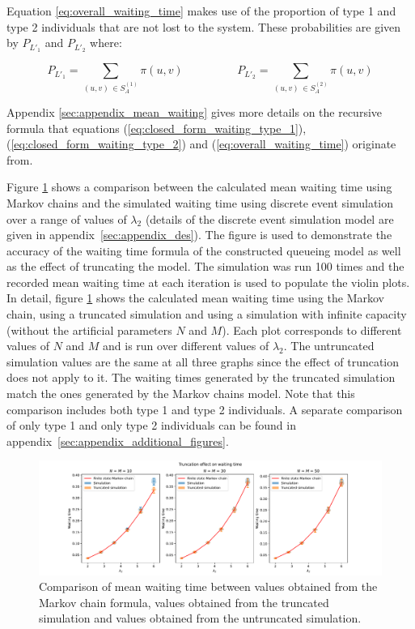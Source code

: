 Equation \ref{eq:overall_waiting_time} makes use of the proportion of type 1 
and type 2 individuals that are not lost to the system. These probabilities are 
given by \(P_{L'_1}\) and \(P_{L'_2}\) where:

\begin{equation}\label{eq:proportion_of_accepting_individuals}
    P_{L'_1} = \sum_{(u,v) \, \in S_A^{(1)}} \pi(u,v) \hspace{2cm}
    P_{L'_2} = \sum_{(u,v) \, \in S_A^{(2)}} \pi(u,v)
\end{equation}
 
Appendix \ref{sec:appendix_mean_waiting} gives more details on the recursive
formula that equations (\ref{eq:closed_form_waiting_type_1}),
(\ref{eq:closed_form_waiting_type_2}) and (\ref{eq:overall_waiting_time})
originate from. 

Figure \ref{fig:markov_vs_des_waiting_time_comparison_overall} shows a 
comparison between the calculated mean waiting time using Markov chains and the
simulated waiting time using discrete event simulation over a range of values of 
\(\lambda_2\) (details of the discrete event simulation model are given in 
appendix~\ref{sec:appendix_des}).
The figure is used to demonstrate the accuracy of the waiting time formula of
the constructed queueing model as well as the effect of truncating the model.
The simulation was run 100 times and the recorded mean waiting time at each 
iteration is used to populate the violin plots.
In detail, figure \ref{fig:markov_vs_des_waiting_time_comparison_overall} shows
the calculated mean waiting time using the Markov chain, using a truncated 
simulation and using a simulation with infinite capacity (without the artificial
parameters \(N\) and \(M\)).
Each plot corresponds to different values of \(N\) and \(M\) and is run over 
different values of \(\lambda_2\).
The untruncated simulation values are the same at all three graphs since
the effect of truncation does not apply to it.
The waiting times generated by the truncated simulation match the ones generated 
by the Markov chains model.
Note that this comparison includes both type 1 and type 2 individuals.
A separate comparison of only type 1 and only type 2 individuals can be found 
in appendix~\ref{sec:appendix_additional_figures}.

\begin{figure}[H]
    \centering
    \includegraphics[width=\textwidth]{imgs/truncation_effect/waiting/main.pdf}
    \caption{
        Comparison of mean waiting time between values obtained from the Markov 
        chain formula, values obtained from the truncated simulation and values
        obtained from the untruncated simulation.
    }
    \label{fig:markov_vs_des_waiting_time_comparison_overall}
\end{figure}
